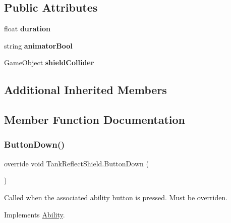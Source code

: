 \subsection*{Public Attributes}
\begin{DoxyCompactItemize}
\item 
\hypertarget{class_tank_reflect_shield_a02d67f0336ccf90f05c42cac26230df4}{}\label{class_tank_reflect_shield_a02d67f0336ccf90f05c42cac26230df4} 
float {\bfseries duration}
\item 
\hypertarget{class_tank_reflect_shield_a9eca051ee20999b021f58d4a381b61b9}{}\label{class_tank_reflect_shield_a9eca051ee20999b021f58d4a381b61b9} 
string {\bfseries animator\+Bool}
\item 
\hypertarget{class_tank_reflect_shield_ac0450aa6b0d1303dcab801ede7bbf00a}{}\label{class_tank_reflect_shield_ac0450aa6b0d1303dcab801ede7bbf00a} 
Game\+Object {\bfseries shield\+Collider}
\end{DoxyCompactItemize}
\subsection*{Additional Inherited Members}


\subsection{Member Function Documentation}
\hypertarget{class_tank_reflect_shield_a1f71fd2db71f237e13ff9e0121230f61}{}\label{class_tank_reflect_shield_a1f71fd2db71f237e13ff9e0121230f61} 
\subsubsection{\texorpdfstring{Button\+Down()}{ButtonDown()}}
{\footnotesize\ttfamily override void Tank\+Reflect\+Shield.\+Button\+Down (\begin{DoxyParamCaption}{ }\end{DoxyParamCaption})\hspace{0.3cm}{\ttfamily [virtual]}}



Called when the associated ability button is pressed. Must be overriden. 



Implements \hyperlink{class_ability_a7722265862f8b29828315725415ce266}{Ability}.

